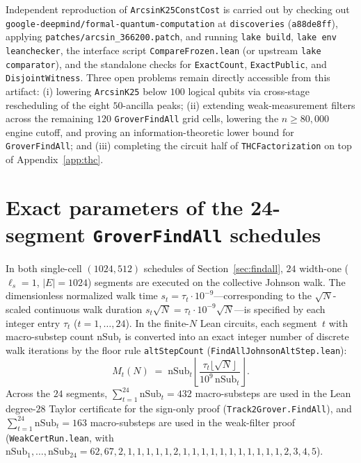 \documentclass[11pt,a4paper]{article}
\theoremstyle{definition}
\theoremstyle{remark}
\begin{document}
Independent reproduction of \texttt{Arcsin\allowbreak K25\allowbreak ConstCost} is carried out by checking out \texttt{google-\allowbreak deepmind/\allowbreak formal-\allowbreak quantum-\allowbreak computation} at \texttt{discoveries} (\texttt{a88de8ff}), applying \texttt{patches/\allowbreak arcsin\_\allowbreak 366200.patch}, and running \texttt{lake build}, \texttt{lake env lean\allowbreak checker}, the interface script \texttt{Compare\allowbreak Frozen.\allowbreak lean} (or upstream \texttt{lake \allowbreak comparator}), and the standalone checks for \texttt{Exact\allowbreak Count}, \texttt{Exact\allowbreak Public}, and \texttt{Disjoint\allowbreak Witness}. Three open problems remain directly accessible from this artifact: (i) lowering \texttt{Arcsin\allowbreak K25} below \(100\) logical qubits via cross-stage rescheduling of the eight \(50\)-ancilla peaks; (ii) extending weak-measurement filters across the remaining \(120\) \texttt{Grover\allowbreak FindAll} grid cells, lowering the \(n \ge 80{,}000\) engine cutoff, and proving an information-theoretic lower bound for \texttt{Grover\allowbreak FindAll}; and (iii) completing the circuit half of \texttt{THC\allowbreak Factorization} on top of Appendix~\ref{app:thc}.

\appendix

\section{Exact parameters of the 24-segment \texttt{GroverFindAll} schedules}
\label{app:schedules}

In both single-cell \((1024,512)\) schedules of Section~\ref{sec:findall}, \(24\) width-one (\(\ell_s = 1\), \(|E| = 1024\)) segments are executed on the collective Johnson walk. The dimensionless normalized walk time \(s_t = \tau_t \cdot 10^{-9}\)---corresponding to the \(\sqrt{N}\)-scaled continuous walk duration \(s_t\sqrt{N} = \tau_t \cdot 10^{-9}\sqrt{N}\)---is specified by each integer entry \(\tau_t\) (\(t = 1,\dots,24\)). In the finite-\(N\) Lean circuits, each segment~\(t\) with macro-substep count \(\mathrm{nSub}_t\) is converted into an exact integer number of discrete walk iterations by the floor rule \texttt{altStepCount} (\texttt{FindAllJohnsonAltStep.lean}):
\[
  M_t(N) \;=\; \mathrm{nSub}_t \left\lfloor \frac{\tau_t \lfloor\sqrt{N}\rfloor}{10^9\,\mathrm{nSub}_t} \right\rfloor.
\]
Across the \(24\) segments, \(\sum_{t=1}^{24} \mathrm{nSub}_t = 432\) macro-substeps are used in the Lean degree-\(28\) Taylor certificate for the sign-only proof (\texttt{Track2Grover.FindAll}), and \(\sum_{t=1}^{24} \mathrm{nSub}_t = 163\) macro-substeps are used in the weak-filter proof (\texttt{WeakCertRun.lean}, with \(\mathrm{nSub}_1,\dots,\mathrm{nSub}_{24} = 62, 67, 2, 1, 1, 1, 1, 1, 2, 1, 1, 1, 1, 1, 1, 1, 1, 1, 1, 1, 2, 3, 4, 5\)).
\end{document}
